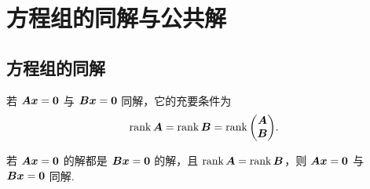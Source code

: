 \section{方程组的同解与公共解}

\subsection{方程组的同解}

\begin{theorem}[同解与秩的等价形式]
    若 $\vb*{Ax}=\vb*{0}$ 与 $\vb*{Bx}=\vb*{0}$ 同解，它的充要条件为 $$\rank\vb*{A}=\rank\vb*{B}=\rank\mqty(\vb*{A}\\\vb*{B}).$$
\end{theorem}

\begin{theorem}
    若 $\vb*{Ax}=\vb*{0}$ 的解都是 $\vb*{Bx}=\vb*{0}$ 的解，且 $\rank\vb*{A}=\rank\vb*{B}$，则 $\vb*{Ax}=\vb*{0}$ 与 $\vb*{Bx}=\vb*{0}$ 同解.
\end{theorem}

